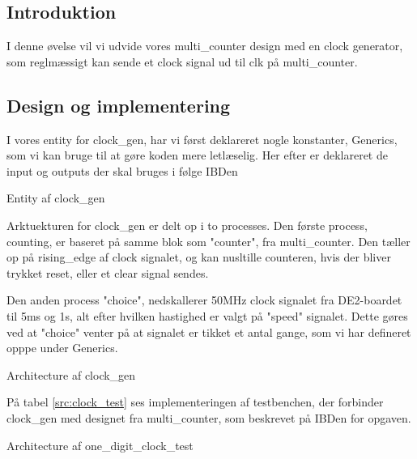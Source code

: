 \documentclass[../journal.tex]{subfiles}
\begin{document}
\subsection{Introduktion}

I denne øvelse vil vi udvide vores multi\_counter design med en clock generator, som reglmæssigt kan sende et clock signal ud til clk på multi\_counter.

\subsection{Design og implementering}

I vores entity for clock\_gen, har vi først deklareret nogle konstanter, Generics, som vi kan bruge til at gøre koden mere letlæselig. Her efter er deklareret de input og outputs der skal bruges i følge IBDen

\begin{table}[H]
    \centering
      \framebox{
        \rule{8pt}{0pt}
          
  }
  \caption{Entity af clock\_gen}	
  \label{src:clock_ent}
\end{table}

Arktuekturen for clock\_gen er delt op i to processes. Den første process, counting, er baseret på samme blok som "counter", fra multi\_counter. Den tæller op på rising\_edge af clock signalet, og kan nusltille counteren, hvis der bliver trykket reset, eller et clear signal sendes. \par
Den anden process "choice", nedskallerer 50MHz clock signalet fra DE2-boardet til 5ms og 1s, alt efter hvilken hastighed er valgt på "speed" signalet. Dette gøres ved at "choice" venter på at signalet er tikket et antal gange, som vi har defineret opppe under Generics. 

\begin{table}[H]
    \centering
      \framebox{
        \rule{8pt}{0pt}
          
  }
  \caption{Architecture af clock\_gen}	
  \label{src:clock_arch}
\end{table}

På tabel \ref{src:clock_test} ses implementeringen af testbenchen, der forbinder clock\_gen med designet fra multi\_counter, som beskrevet på IBDen for opgaven.

\begin{table}[H]
    \centering
      \framebox{
        \rule{8pt}{0pt}
          
  }
  \caption{Architecture af one\_digit\_clock\_test}	
  \label{src:clock_test}
\end{table}
\end{document}
